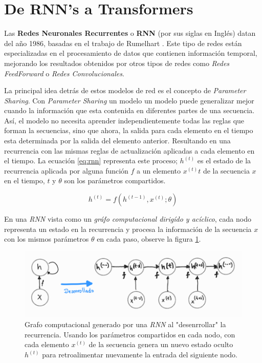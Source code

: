 \section{De RNN's a Transformers}

Las \textbf{Redes Neuronales Recurrentes} o \textbf{RNN} (por sus siglas en Inglés) datan del año
1986, basadas en el trabajo de Rumelhart \cite{Rumelhart}. Este tipo de redes están especializadas
en el procesamiento de datos que contienen información temporal, mejorando los resultados obtenidos
por otros tipos de redes como \textit{Redes FeedForward} o \textit{Redes Convolucionales}.

La principal idea detrás de estos modelos de red es el concepto de \textit{Parameter Sharing}.
Con \textit{Parameter Sharing} un modelo un modelo puede generalizar mejor cuando la información
que esta contenida en diferentes partes de una secuencia. Así, el modelo no necesita aprender
independientemente todas las reglas que forman la secuencias, sino que ahora, la salida para cada
elemento en el tiempo esta determinada por la salida del elemento anterior. Resultando en una
recurrencia con las mismas reglas de actualización aplicadas a cada elemento en el tiempo.
La ecuación \ref{eq:rnn} representa este proceso; $h^{(t)}$ es el estado de la recurrencia aplicada
por alguna función $f$ a un elemento $x^{(t)}t$ de la secuencia $x$ en el tiempo, $t$ y $\theta$ son
los parámetros compartidos.

\begin{equation}
    h^{(t)} = f(h^{(t-1)}, x^{(t)}; \theta)
\end{equation}
\label{eq:rnn}

En una \textit{RNN} vista como un \textit{gráfo computacional dirigído y acíclico}, cada nodo
representa un estado en la recurrencia y procesa la información de la secuencia $x$ con los mismos
parámetros $\theta$ en cada paso, observe la figura \ref{fig:rnn_cg}.

\begin{figure}[h!]
\centering
\includegraphics[width=.8\textwidth]{Chapters/1. Transformer/Figures/rnn/rnn_cgraph.png}
\caption[RNN - Grafo Computacional]{Grafo computacional generado por una \textit{RNN} al "desenrrollar" la
recurrencia. Usando los parámetros compartidos en cada nodo, con cada elemento $x^{(t)}$ de la
secuencia genera un nuevo estado oculto $h^{(t)}$ para retroalimentar nuevamente la entrada del
siguiente nodo.}
\label{fig:rnn_cg}
\end{figure}

